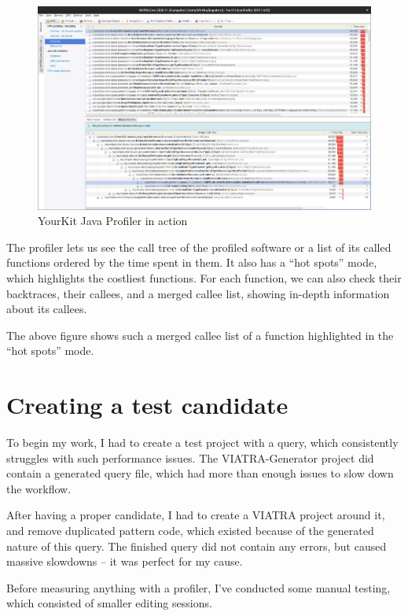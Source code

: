 \documentclass[11pt,a4paper,oneside]{report}
\begin{document}
\begin{figure}[ht]
\centering
\includegraphics[width=150mm, keepaspectratio]{figures/yourkit-profiler.png}
\caption{YourKit Java Profiler in action}
\label{fig:yourkit-profiler}
\end{figure}

The profiler lets us see the call tree of the profiled software or a list of its
called functions ordered by the time spent in them. It also has a ``hot spots''
mode, which highlights the costliest functions. For each function, we can also
check their backtraces, their callees, and a merged callee list, showing
in-depth information about its callees.

The above figure shows such a merged callee list of a function highlighted in
the ``hot spots'' mode.

\section{Creating a test candidate}
To begin my work, I had to create a test project with a query, which
consistently struggles with such performance issues. The VIATRA-Generator
project\cite{github-viatra-generator} did contain a generated query file, which
had more than enough issues to slow down the workflow.

After having a proper candidate, I had to create a VIATRA
project\cite{github-viatra-vql-slowdown-example} around it, and
remove duplicated pattern code, which existed because of the generated nature
of this query. The finished query did not contain any errors, but caused massive
slowdowns -- it was perfect for my cause.

Before measuring anything with a profiler, I've conducted some manual testing,
which consisted of smaller editing sessions.
\end{document}

